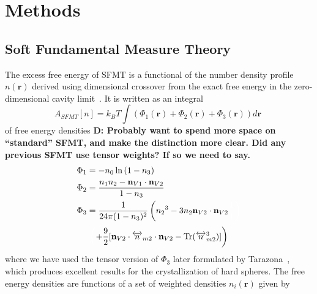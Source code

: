 \documentclass[letterpaper,twocolumn,amsmath,amssymb,prb]{revtex4-1}
\newcommand{\rr}{\textbf{r}}
\newcommand\davidsays[1]{{\bf \color{blue}D: #1}}
\begin{document}
\section{Methods}

\subsection{Soft Fundamental Measure Theory}

The excess free energy of SFMT is a functional of the number density 
profile $n(\textbf{r})$ derived using dimensional crossover from the exact 
free energy in the 
zero-dimensional cavity limit~\cite{schmidt1999density}.
It is written as an integral 
\begin{equation}
A_\textit{SFMT}[n] = k_B T \int \left(\Phi_1(\rr) + \Phi_2(\rr) +
\Phi_3(\rr)\right) d\rr \; \label{eq:sfmt-excess-free}
\end{equation}
of free energy densities \davidsays{Probably want to spend more space on
``standard'' SFMT, and make the distinction more clear.  Did any previous SFMT
use tensor weights? If so we need to say.
}
\begin{align}
\Phi_1 &= -n_0 \ln\left( 1 - n_3\right)\\
\Phi_2 &= \frac{n_1 n_2 - \mathbf{n}_{V1}\cdot\mathbf{n}_{V2}}{1-n_3} \\
\Phi_3 &= \frac{1}{24\pi(1-n_3)^2}\left({n_2}^3-3n_2\mathbf{n}_{V2}
\cdot\mathbf{n}_{V2}\color{white}\frac{1}{1}\right)\color{black}
\label{eq:sfmt-phi3}
\end{align}
\begin{displaymath}\color{white}\left(\color{black}+\frac{9}{2}
[\mathbf{n}_{V2}\cdot{\overleftrightarrow{n}_{m2}}\cdot{\mathbf{n}_{V2}}-
\operatorname{Tr}({\overleftrightarrow{n}^3_{m2}})]\right)\end{displaymath}
where we have used the tensor version of $\Phi_3$ later formulated by 
Tarazona~\cite{tarazona2000,santos2012phi3}, which produces excellent
results for the crystallization of hard spheres.
The free energy densities are functions of a set of weighted densities $n_{i}(\textbf{r})$ 
given by %
\end{document}
